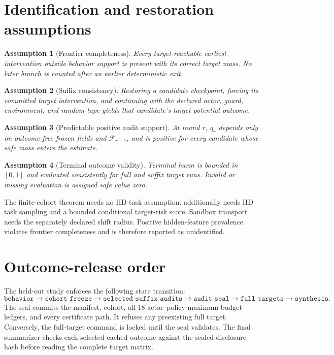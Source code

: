 \documentclass{article}
\newcommand{\F}{\mathcal{F}}
\newtheorem{assumption}{Assumption}
\begin{document}
\section{Identification and restoration assumptions}
\label{app:assumptions}

\begin{assumption}[Frontier completeness]
Every target-reachable earliest intervention outside behavior support is present with its correct
target mass. No later branch is counted after an earlier deterministic exit.
\end{assumption}

\begin{assumption}[Suffix consistency]
Restoring a candidate checkpoint, forcing its committed target intervention, and continuing with
the declared actor, guard, environment, and random tape yields that candidate's target potential
outcome.
\end{assumption}

\begin{assumption}[Predictable positive audit support]
At round $r$, $q_r$ depends only on outcome-free frozen fields and $\F_{r-1}$, and is positive for
every candidate whose safe mass enters the estimate.
\end{assumption}

\begin{assumption}[Terminal outcome validity]
Terminal harm is bounded in $[0,1]$ and evaluated consistently for full and suffix target runs.
Invalid or missing evaluation is assigned safe value zero.
\end{assumption}

The finite-cohort theorem needs no IID task assumption.  additionally needs
IID task sampling and a bounded conditional target-risk score. Sandbox transport needs the
separately declared shift radius. Positive hidden-feature prevalence violates frontier
completeness and is therefore reported as unidentified.

\section{Outcome-release order}
\label{app:release}

The held-out study enforces the following state transition:
\begin{equation}
\texttt{behavior}
\rightarrow\texttt{cohort freeze}
\rightarrow\texttt{selected suffix audits}
\rightarrow\texttt{audit seal}
\rightarrow\texttt{full targets}
\rightarrow\texttt{synthesis}.
\end{equation}
The seal commits the manifest, cohort, all 18 actor--policy maximum-budget ledgers, and every
certificate path. It refuses any preexisting full target. Conversely, the full-target command is
locked until the seal validates. The final summarizer checks each selected cached outcome against
the sealed disclosure hash before reading the complete target matrix.
\end{document}
